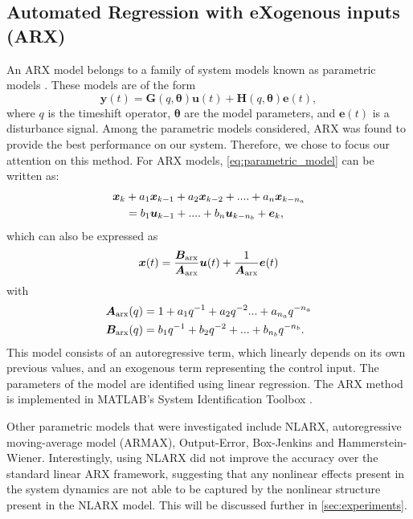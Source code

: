 \documentclass[../main.tex]{subfiles}
\begin{document}

\subsection{Automated Regression with eXogenous inputs (ARX)}
\label{sec:arx}
An ARX model belongs to a family of system models known as parametric models \cite{ljung1999}. These models are of the form
\begin{equation}
    \label{eq:parametric_model}
    \bm{y}(t) = \bm{G}(q, \bm{\theta}) \bm{u}(t) + \bm{H}(q, \bm{\theta}) \bm{e}(t),
\end{equation}
where $q$ is the timeshift operator, $\bm{\theta}$ are the model parameters, and $\bm{e}(t)$ is a disturbance signal. Among the parametric models considered, ARX was found to provide the best performance on our system. Therefore, we chose to focus our attention on this method. For ARX models, \cref{eq:parametric_model} can be written as:
\begin{align}
    \label{eq:arx_equation}
    \bm{x}_k &+ a_1\bm{x}_{k-1} + a_2\bm{x}_{k-2} + .... + a_n\bm{x}_{k-n_a} \notag\\
    &= b_1\bm{u}_{k-1} + .... + b_n\bm{u}_{k-n_b} + \bm{e}_k,
\end{align}
which can also be expressed as
\begin{equation}
    \bm{x}(t) = \frac{\bm{B}_{\rm arx}}{\bm{A}_{\rm arx}} \bm{u}(t) + \frac{1}{\bm{A}_{\rm arx}} \bm{e}(t)
\end{equation}
with \begin{align}
    \bm{A}_{\rm arx}(q) &= 1 + a_1 q^{-1} + a_2 q^{-2}... + a_{n_a} q^{-n_a}  \\
    \bm{B}_{\rm arx}(q) &= b_1 q^{-1} + b_2 q^{-2} + ... + b_{n_b} q^{-n_b}.
\end{align}
This model consists of an autoregressive term, which linearly depends on its own previous values, and an exogenous term representing the control input. The parameters of the model are identified using linear regression. The ARX method is implemented in MATLAB's System Identification Toolbox \cite{MATLAB_SysID}.

Other parametric models that were investigated include NLARX, autoregressive moving-average model (ARMAX), Output-Error, Box-Jenkins and Hammerstein-Wiener. Interestingly, using NLARX did not improve the accuracy over the standard linear ARX framework, suggesting that any nonlinear effects present in the system dynamics are not able to be captured by the nonlinear structure present in the NLARX model. This will be discussed further in \cref{sec:experiments}.
\end{document}
